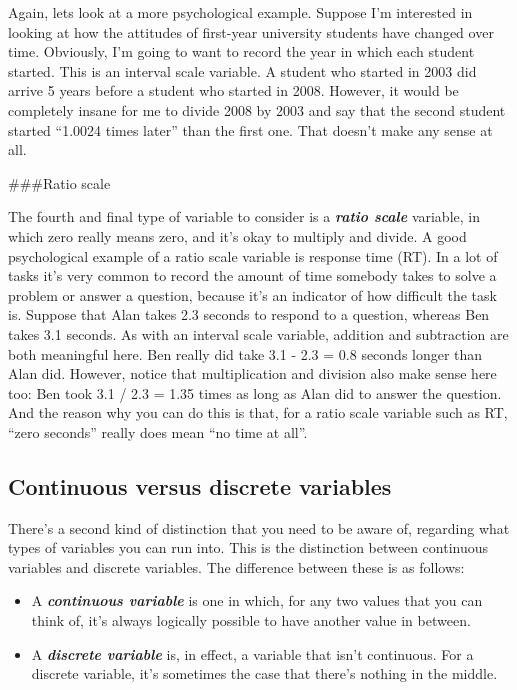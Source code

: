 \documentclass[]{book}
\providecommand{\tightlist}{%
  \setlength{\itemsep}{0pt}\setlength{\parskip}{0pt}}
\begin{document}
Again, lets look at a more psychological example. Suppose I'm interested in looking at how the attitudes of first-year university students have changed over time. Obviously, I'm going to want to record the year in which each student started. This is an interval scale variable. A student who started in 2003 did arrive 5 years before a student who started in 2008. However, it would be completely insane for me to divide 2008 by 2003 and say that the second student started ``1.0024 times later'' than the first one. That doesn't make any sense at all.

\#\#\#Ratio scale

The fourth and final type of variable to consider is a \textbf{\emph{ratio scale}} variable, in which zero really means zero, and it's okay to multiply and divide. A good psychological example of a ratio scale variable is response time (RT). In a lot of tasks it's very common to record the amount of time somebody takes to solve a problem or answer a question, because it's an indicator of how difficult the task is. Suppose that Alan takes 2.3 seconds to respond to a question, whereas Ben takes 3.1 seconds. As with an interval scale variable, addition and subtraction are both meaningful here. Ben really did take 3.1 - 2.3 = 0.8 seconds longer than Alan did. However, notice that multiplication and division also make sense here too: Ben took 3.1 / 2.3 = 1.35 times as long as Alan did to answer the question. And the reason why you can do this is that, for a ratio scale variable such as RT, ``zero seconds'' really does mean ``no time at all''.

\hypertarget{continuousdiscrete}{%
\subsection{Continuous versus discrete variables}\label{continuousdiscrete}}

There's a second kind of distinction that you need to be aware of, regarding what types of variables you can run into. This is the distinction between continuous variables and discrete variables. The difference between these is as follows:

\begin{itemize}
\tightlist
\item
  A \textbf{\emph{continuous variable}} is one in which, for any two values that you can think of, it's always logically possible to have another value in between.
\item
  A \textbf{\emph{discrete variable}} is, in effect, a variable that isn't continuous. For a discrete variable, it's sometimes the case that there's nothing in the middle.
\end{itemize}
\end{document}
